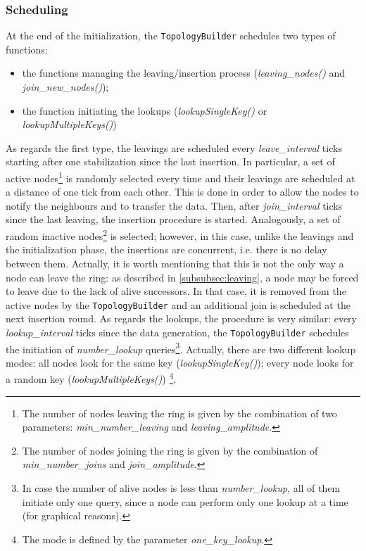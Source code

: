 \documentclass[11pt,twocolumn,letterpaper]{article}
\begin{document}
	\subsubsection{Scheduling}
	\label{subsubsec:top-scheduling}
	At the end of the initialization, the \texttt{TopologyBuilder} schedules two types of functions:
	\begin{itemize}
		\item the functions managing the leaving/insertion process (\textit{leaving\_nodes()} and \textit{join\_new\_nodes()});
		\item the function initiating the lookups (\textit{lookupSingleKey()} or \textit{lookupMultipleKeys()})
	\end{itemize}
	As regards the first type, the leavings are scheduled every \textit{leave\_interval} ticks starting after one stabilization since the last insertion. In particular, a set of active nodes\footnote{The number of nodes leaving the ring is given by the combination of two parameters: \textit{min\_number\_leaving} and \textit{leaving\_amplitude}.} is randomly selected every time and their leavings are scheduled at a distance of one tick from each other. This is done in order to allow the nodes to notify the neighbours and to transfer the data. Then, after \textit{join\_interval} ticks since the last leaving, the insertion procedure is started. Analogously, a set of random inactive nodes\footnote{The number of nodes joining the ring is given by the combination of \textit{min\_number\_joins} and \textit{join\_amplitude}.} is selected; however, in this case, unlike the leavings and the initialization phase, the insertions are concurrent, i.e. there is no delay between them. \newline
	Actually, it is worth mentioning that this is not the only way a node can leave the ring: as described in \cref{subsubsec:leaving}, a node may be forced to leave due to the lack of alive successors. In that case, it is removed from the active nodes by the \texttt{TopologyBuilder} and an additional join is scheduled at the next insertion round.\newline
	As regards the lookups, the procedure is very similar: every \textit{lookup\_interval} ticks since the data generation, the \texttt{TopologyBuilder} schedules the initiation of \textit{number\_lookup} queries\footnote{In case the number of alive nodes is less than \textit{number\_lookup}, all of them initiate only one query, since a node can perform only one lookup at a time (for graphical reasons).}. Actually, there are two different lookup modes: all nodes look for the same key (\textit{lookupSingleKey()}); every node looks for a random key (\textit{lookupMultipleKeys()}) \footnote{The mode is defined by the parameter \textit{one\_key\_lookup}.}.
	
\end{document}

